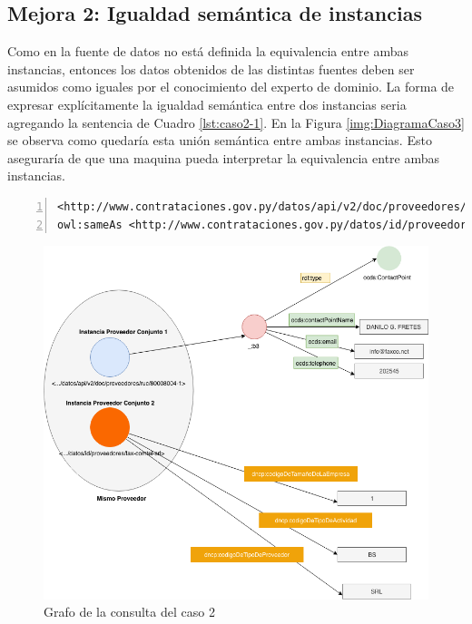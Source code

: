  \subsection{Mejora 2: Igualdad semántica de instancias}
 \label{section:caso2mejora2}
 Como en la fuente de datos no está definida la equivalencia entre ambas instancias, entonces los datos obtenidos de las distintas fuentes deben ser asumidos como iguales por el conocimiento del experto de dominio. La forma de expresar explícitamente la igualdad semántica entre dos instancias seria agregando la sentencia de Cuadro \ref{lst:caso2-1}. En la Figura \ref{img:DiagramaCaso3} se observa como quedaría esta unión semántica entre ambas instancias. Esto aseguraría de que una maquina pueda interpretar la equivalencia entre ambas instancias. 
 
 
\noindent\begin{minipage}[c]{\textwidth}
    \begin{lstlisting}[captionpos=b, caption=Declaración de igualdad semántica de dos instancias, label=lst:caso2-1,  numbers=left,  numberstyle=\tiny\color{mygray},frame=single]
<http://www.contrataciones.gov.py/datos/api/v2/doc/proveedores/ruc/80008004-1> 
owl:sameAs <http://www.contrataciones.gov.py/datos/id/proveedores/fax-comtel-srl>  .

     \end{lstlisting}
\end{minipage}
     \begin{figure}[ht!]
        \centering
        \includegraphics[width=150mm]{figuras/Diagramas-Caso2.png}
        \caption{Grafo de la consulta del caso 2}
        \label{img:DiagramaCaso2}
     \end{figure}

